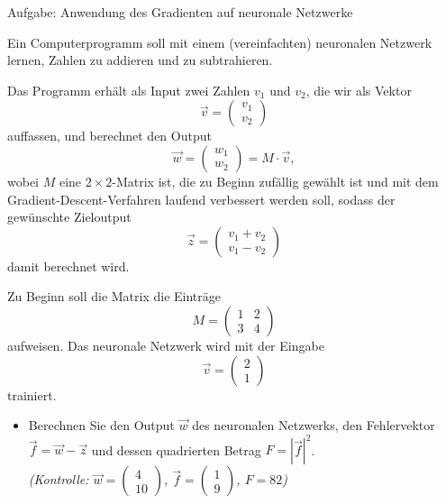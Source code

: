 \begin{LA}
	{Aufgabe: Anwendung des Gradienten auf neuronale Netzwerke}{}


	Ein Computerprogramm soll mit einem (vereinfachten) neuronalen Netzwerk lernen, Zahlen zu addieren und zu subtrahieren.

	Das Programm erhält als Input zwei Zahlen \( v_1 \) und \( v_2 \), die wir als Vektor
	\[
		\vec{v} = \begin{pmatrix} v_1 \\ v_2 \end{pmatrix}
	\]
	auffassen, und berechnet den Output
	\[
		\vec{w} = \begin{pmatrix} w_1 \\ w_2 \end{pmatrix} = M \cdot \vec{v},
	\]
	wobei \( M \) eine \( 2 \times 2 \)-Matrix ist, die zu Beginn zufällig gewählt ist und mit dem Gradient-Descent-Verfahren laufend verbessert werden soll, sodass der gewünschte Zieloutput
	\[
		\vec{z} = \begin{pmatrix} v_1 + v_2 \\ v_1 - v_2 \end{pmatrix}
	\]
	damit berechnet wird.

	\medskip

	Zu Beginn soll die Matrix die Einträge
	\[
		M = \begin{pmatrix} 1 & 2 \\ 3 & 4 \end{pmatrix}
	\]
	aufweisen. Das neuronale Netzwerk wird mit der Eingabe
	\[
		\vec{v} = \begin{pmatrix} 2 \\ 1 \end{pmatrix}
	\]
	trainiert.

	\begin{itemize}
		\item Berechnen Sie den Output \( \vec{w} \) des neuronalen Netzwerks, den Fehlervektor \( \vec{f} = \vec{w} - \vec{z} \) und dessen quadrierten Betrag \( F = |\vec{f}|^2 \).\\
		      \textit{(Kontrolle: \( \vec{w} = \begin{pmatrix} 4 \\ 10 \end{pmatrix} \), \( \vec{f} = \begin{pmatrix} 1 \\ 9 \end{pmatrix} \), \( F = 82 \))}
	\end{itemize}


\end{LA}
